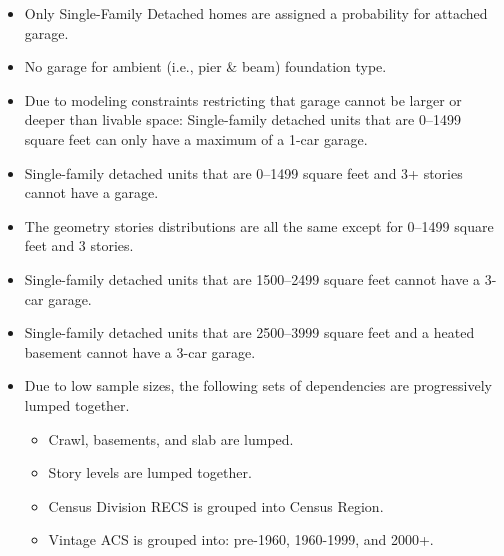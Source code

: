 \begin{itemize}
    \item Only Single-Family Detached homes are assigned a probability for attached garage.
    \item No garage for ambient (i.e., pier \& beam) foundation type.
    \item Due to modeling constraints restricting that garage cannot be larger or deeper than livable space: Single-family detached units that are 0--1499 square feet can only have a maximum of a 1-car garage.
    \item Single-family detached units that are 0--1499 square feet and 3+ stories cannot have a garage.
    \item The geometry stories distributions are all the same except for 0--1499 square feet and 3 stories.
    \item Single-family detached units that are 1500--2499 square feet cannot have a 3-car garage.
    \item Single-family detached units that are 2500--3999 square feet and a heated basement cannot have a 3-car garage.
    \item Due to low sample sizes, the following sets of dependencies are progressively lumped together.
    \begin{itemize}
    \item [1] Crawl, basements, and slab are lumped.
    \item [2] Story levels are lumped together.
    \item [3] Census Division RECS is grouped into Census Region.
    \item [4] Vintage ACS is grouped into: pre-1960, 1960-1999, and 2000+.
    \end{itemize}
\end{itemize}
